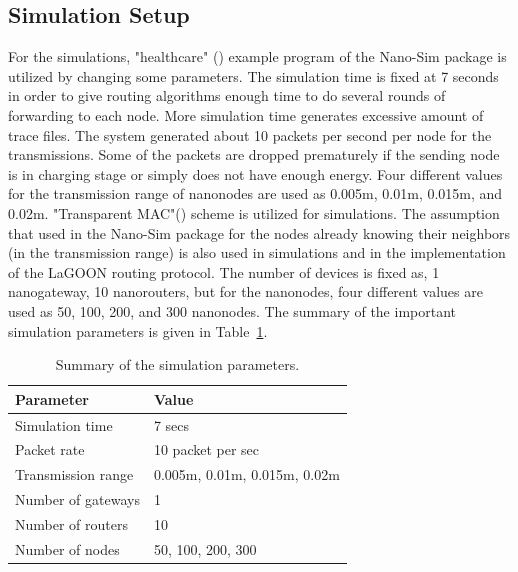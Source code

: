 \documentclass[12pt, oneandhalf, chaparabic, sees, ms]{metu}
\begin{document}
\subsection{Simulation Setup}\label{ssimsetup}
For the simulations, "healthcare" (\cite{piroPA2013, piroNS32013}) example program of the Nano-Sim package is utilized by changing some parameters.
The simulation time is fixed at 7 seconds in order to give routing algorithms enough time to do several rounds of forwarding to each node.
More simulation time generates excessive amount of trace files.
The system generated about 10 packets per second per node for the transmissions.
Some of the packets are dropped prematurely if the sending node is in charging stage or simply does not have enough energy.
Four different values for the transmission range of nanonodes are used as 0.005m, 
0.01m, 0.015m, and 0.02m. "Transparent MAC"(\cite{piroNS32013, piroPA2013}) scheme is utilized for simulations. 
The assumption that used in the Nano-Sim package for the nodes already knowing their neighbors (in the transmission range) is also used in simulations and in the implementation of the LaGOON routing protocol. The number of devices is fixed as, 1 nanogateway, 10 nanorouters, but for the nanonodes, four different values are used as 50, 100, 200, and 300 nanonodes. 
The summary of the important simulation parameters is given in Table~\ref{tab:sim-par}.


\vspace{2cm}

\renewcommand{\arraystretch}{1.2}%
\begin{table}[H]
\begin{center}
\caption{Summary of the simulation parameters.}
\label{tab:sim-par}
\begin{adjustbox}{max width=\columnwidth}
\begin{tabular}{| l || l |}
\hline
\rowcolor{lightgray}
\textbf{Parameter} & \textbf{Value} \tabularnewline
\hline \hline 
Simulation time      &  7 secs   \tabularnewline \hline
Packet rate          &  10 packet per sec   \tabularnewline \hline
Transmission range   &  0.005m, 0.01m, 0.015m, 0.02m   \tabularnewline \hline
Number of gateways   & 1  \tabularnewline \hline
Number of routers    & 10  \tabularnewline \hline
Number of nodes      &  50, 100, 200, 300   \tabularnewline \hline
\end{tabular}
\end{adjustbox}
\end{center}
\end{table}
\renewcommand{\arraystretch}{1}%
\end{document}
